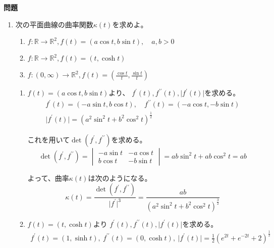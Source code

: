 \documentclass[12pt,b5paper]{ltjsarticle}
\begin{document}
\hrulefill
\textbf{問題}
\hrulefill

\begin{enumerate}
 \item
      次の平面曲線の曲率関数$\kappa (t)$を求めよ。
      \begin{enumerate}
       \item
            $f:\mathbb{R} \to \mathbb{R}^2, f(t)=(a\cos t, b\sin t), \quad a,b>0$

       \item
            $f:\mathbb{R} \to \mathbb{R}^2, f(t)=(t, \cosh t)$

       \item
            $f:(0,\infty) \to \mathbb{R}^2, f(t)=(\frac{\cos t}{t}, \frac{\sin t}{t})$
      \end{enumerate}

\dotfill

\begin{enumerate}
 \item
      $f(t)=(a\cos t, b\sin t)$より、
      $f^{\prime}(t), f^{\prime\prime}(t), \lvert f^{\prime}(t) \rvert$を求める。
      \begin{gather}
       f^{\prime}(t) = (-a\sin t, b\cos t),\quad
       f^{\prime\prime}(t) = (-a\cos t, -b\sin t)\\
       \lvert f^{\prime}(t) \rvert = (a^2\sin^2 t+b^2\cos^2 t)^{\frac{1}{2}}
      \end{gather}

      これを用いて$\det(f^{\prime},f^{\prime\prime})$を求める。
      \begin{equation}
       \det(f^{\prime},f^{\prime\prime})=
        \begin{vmatrix}
         -a\sin t & -a\cos t\\
         b\cos t & -b\sin t
        \end{vmatrix}
        = ab\sin^2 t + ab\cos^2 t = ab
      \end{equation}

      よって、曲率$\kappa(t)$は次のようになる。
      \begin{equation}
       \kappa(t) = \frac{\det(f^{\prime},f^{\prime\prime})}{\lvert f^{\prime} \rvert^3}
        = \frac{ab}{(a^2\sin^2 t+b^2\cos^2 t)^{\frac{3}{2}}}
      \end{equation}


 \item
      $f(t)=(t, \cosh t)$より
      $f^{\prime}(t), f^{\prime\prime}(t), \lvert f^{\prime}(t) \rvert$を求める。
      \begin{gather}
       f^{\prime}(t) = (1,\sinh t),\
       f^{\prime\prime}(t) = (0,\cosh t),\
       \lvert f^{\prime}(t) \rvert = \frac{1}{2}(e^{2t}+e^{-2t}+2)^{\frac{1}{2}}
      \end{gather}


\end{enumerate}
\end{enumerate}
\end{document}
